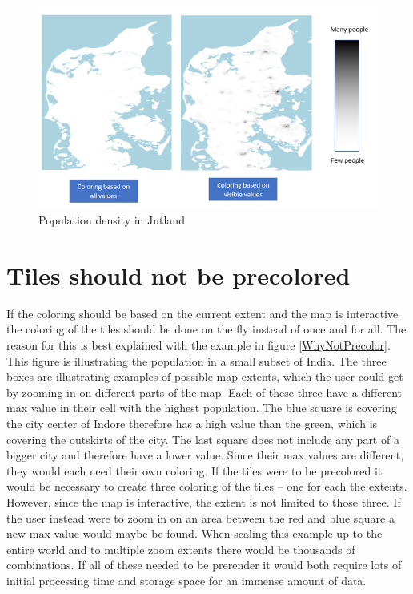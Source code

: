 \begin{figure} [H]
	\centering
	\includegraphics[width=.8\textwidth]{Pictures/WhyLimitToExtent}
	\caption{Population density in Jutland}
	\label{WhyLimitToExtent}
\end{figure}


\section{Tiles should not be precolored}
If the coloring should be based on the current extent and the map is interactive the coloring of the tiles should be done on the fly instead of once and for all. The reason for this is best explained with the example in figure \ref{WhyNotPrecolor}. This figure is illustrating the population in a small subset of India.  The three boxes are illustrating examples of possible map extents, which the user could get by zooming in on different parts of the map. Each of these three have a different max value in their cell with the highest population. The blue square is covering the city center of Indore therefore has a high value than the green, which is covering the outskirts of the city. The last square does not include any part of a bigger city and therefore have a lower value. 
Since their max values are different, they would each need their own coloring. If the tiles were to be precolored it would be necessary to create three coloring of the tiles – one for each the extents. However, since the map is interactive, the extent is not limited to those three. If the user instead were to zoom in on an area between the red and blue square a new max value would maybe be found. When scaling this example up to the entire world and to multiple zoom extents there would be thousands of combinations. If all of these needed to be prerender it would both require lots of initial processing time and storage space for an immense amount of data. 



